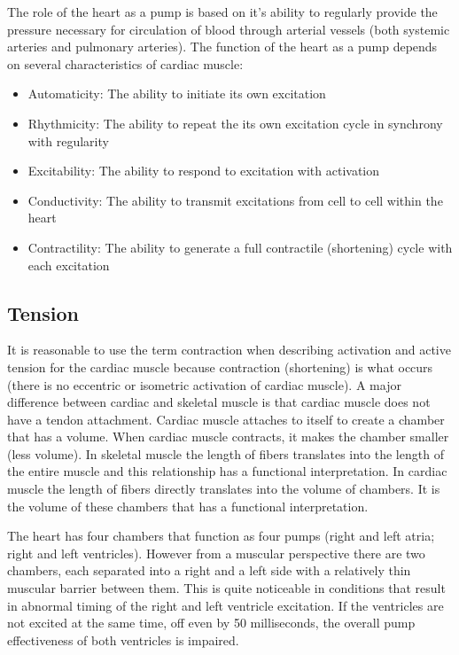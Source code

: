 The role of the heart as a pump is based on it's ability to regularly provide the pressure necessary for circulation of blood through arterial vessels (both systemic arteries and pulmonary arteries). The function of the heart as a pump depends on several characteristics of cardiac muscle:

\begin{itemize}
    
    \item Automaticity: The ability to initiate its own excitation
    \item Rhythmicity: The ability to repeat the its own excitation cycle in synchrony with regularity
    \item Excitability: The ability to respond to excitation with activation
    \item Conductivity: The ability to transmit excitations from cell to cell within the heart
    \item Contractility: The ability to generate a full contractile (shortening) cycle with each excitation
 
\end{itemize}

\subsection{Tension}

It is reasonable to use the term contraction when describing activation and active tension for the cardiac muscle because contraction (shortening) is what occurs (there is no eccentric or isometric activation of cardiac muscle). A major difference between cardiac and skeletal muscle is that cardiac muscle does not have a tendon attachment. Cardiac muscle attaches to itself to create a chamber that has a volume. When cardiac muscle contracts, it makes the chamber smaller (less volume). In skeletal muscle the length of fibers translates into the length of the entire muscle and this relationship has a functional interpretation. In cardiac muscle the length of fibers directly translates into the volume of chambers. It is the volume of these chambers that has a functional interpretation. 

The heart has four chambers that function as four pumps (right and left atria; right and left ventricles). However from a muscular perspective there are two chambers, each separated into a right and a left side with a relatively thin muscular barrier between them. This is quite noticeable in conditions that result in abnormal timing of the right and left ventricle excitation. If the ventricles are not excited at the same time, off even by 50 milliseconds, the overall pump effectiveness of both ventricles is impaired.


